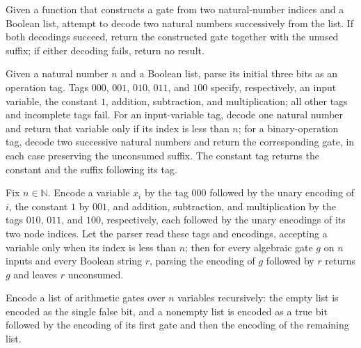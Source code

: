 \begin{definition}
\label{Randomized.AlgGate.parseBin}
\leanok
{}
Given a function that constructs a gate from two natural-number indices and a Boolean
list, attempt to decode two natural numbers successively from the list. If both
decodings succeed, return the constructed gate together with the unused suffix; if
either decoding fails, return no result.
\end{definition}

\begin{definition}
\label{Randomized.AlgGate.parse}
\leanok
{}
Given a natural number $n$ and a Boolean list, parse its initial three bits as an
operation tag. Tags $000$, $001$, $010$, $011$, and $100$ specify, respectively, an
input variable, the constant $1$, addition, subtraction, and multiplication; all other
tags and incomplete tags fail. For an input-variable tag, decode one natural number and
return that variable only if its index is less than $n$; for a binary-operation tag,
decode two successive natural numbers and return the corresponding gate, in each case
preserving the unconsumed suffix. The constant tag returns the constant and the suffix
following its tag.
\end{definition}

\begin{theorem}
\label{Randomized.AlgGate.parse_encode}
\leanok
{}
Fix $n\in\mathbb{N}$. Encode a variable $x_i$ by the tag $000$ followed by the unary
encoding of $i$, the constant $1$ by $001$, and addition, subtraction, and
multiplication by the tags $010$, $011$, and $100$, respectively, each followed by the
unary encodings of its two node indices. Let the parser read these tags and encodings,
accepting a variable only when its index is less than $n$; then for every algebraic gate
$g$ on $n$ inputs and every Boolean string $r$, parsing the encoding of $g$ followed by
$r$ returns $g$ and leaves $r$ unconsumed.
\end{theorem}

\begin{definition}
\label{Randomized.AlgCircuit.encodeGates}
\leanok
{}
Encode a list of arithmetic gates over $n$ variables recursively: the empty list is
encoded as the single false bit, and a nonempty list is encoded as a true bit followed
by the encoding of its first gate and then the encoding of the remaining list.
\end{definition}


